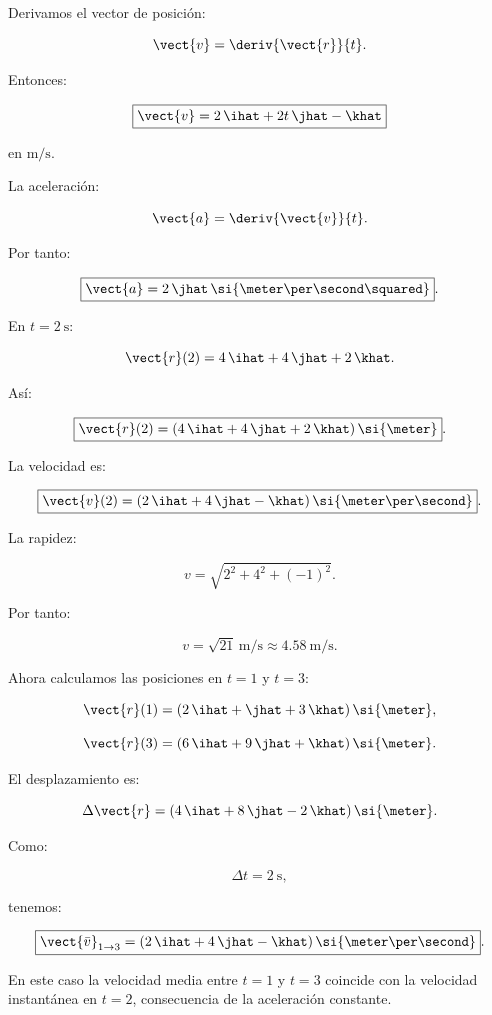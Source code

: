 \begin{explicacion}
Derivamos el vector de posición:

\[
\vect{v}
=
\deriv{\vect{r}}{t}.
\]

Entonces:

\[
\boxed{
\vect{v}
=
2\,\ihat+2t\,\jhat-\khat
}
\]

en \(\si{\meter\per\second}\).

La aceleración:

\[
\vect{a}
=
\deriv{\vect{v}}{t}.
\]

Por tanto:

\[
\boxed{
\vect{a}
=
2\,\jhat\,
\si{\meter\per\second\squared}
}.
\]

En \(t=\SI{2}{\second}\):

\[
\vect{r}(2)
=
4\,\ihat+4\,\jhat+2\,\khat.
\]

Así:

\[
\boxed{
\vect{r}(2)
=
(4\,\ihat+4\,\jhat+2\,\khat)\,\si{\meter}
}.
\]

La velocidad es:

\[
\boxed{
\vect{v}(2)
=
(2\,\ihat+4\,\jhat-\khat)\,
\si{\meter\per\second}
}.
\]

La rapidez:

\[
v
=
\sqrt{2^2+4^2+(-1)^2}.
\]

Por tanto:

\[
\boxed{
v=\sqrt{21}\,\si{\meter\per\second}
\approx
\SI{4.58}{\meter\per\second}
}.
\]

Ahora calculamos las posiciones en \(t=1\) y \(t=3\):

\[
\vect{r}(1)
=
(2\,\ihat+\jhat+3\,\khat)\,\si{\meter},
\]

\[
\vect{r}(3)
=
(6\,\ihat+9\,\jhat+\khat)\,\si{\meter}.
\]

El desplazamiento es:

\[
\Delta\vect{r}
=
(4\,\ihat+8\,\jhat-2\,\khat)\,\si{\meter}.
\]

Como:

\[
\Delta t=\SI{2}{\second},
\]

tenemos:

\[
\boxed{
\vect{\bar{v}}_{1\to3}
=
(2\,\ihat+4\,\jhat-\khat)\,
\si{\meter\per\second}
}.
\]

En este caso la velocidad media entre \(t=1\) y \(t=3\) coincide con la velocidad instantánea en \(t=2\), consecuencia de la aceleración constante.
\end{explicacion}


